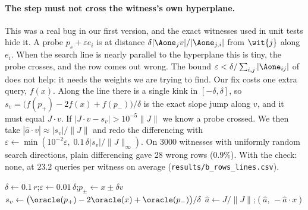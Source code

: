 \paragraph{The step must not cross the witness's own hyperplane.}
This was a real bug in our first version, and the exact witnesses used in
unit tests hide it. A probe $p_s+\varepsilon e_i$ is at distance
$\delta|\Aone_j v|/|\Aone_{j,i}|$ from $\wit{j}$ along $e_i$. When the search
line is nearly parallel to the hyperplane this is tiny, the probe crosses,
and the row comes out wrong. The bound
$\varepsilon<\delta/\sum_{i,j}|\Aone_{ij}|$ of~\cite[\S4.2]{DBLP:conf/crypto/CarliniJM20}
does not help: it needs the weights we are trying to find. Our fix costs one
extra query, $f(x)$. Along the line there is a single kink in
$[-\delta,\delta]$, so
$s_v=\bigl(f(p_{+})-2f(x)+f(p_{-})\bigr)/\delta$ is the exact slope jump along
$v$, and it must equal $J\cdot v$. If $|J\cdot v-s_v|>10^{-5}\|J\|$ we know a
probe crossed. We then take $|\hat a\cdot v|\approx|s_v|/\|J\|$ and redo the
differencing with
$\varepsilon\gets\min(10^{-2}\varepsilon,\;0.1\,\delta|s_v|/\|J\|_\infty)$.
On 3000 witnesses with uniformly random search directions, plain
differencing gave 28 wrong rows ($0.9\%$). With the check: none, at
$23.2$ queries per witness on average (\texttt{results/b\_rows\_lines.csv}).

\begin{algorithm}[t]
\caption{\texttt{row\_from\_witness}: one row of $\Aone$ (up to sign) from a witness.}
\label{alg:B-row}
$\delta\gets 0.1\,r$;\quad $\varepsilon\gets 0.01\,\delta$;\quad $p_{\pm}\gets x\pm\delta v$\;
$s_v\gets\bigl(\oracle(p_+)-2\oracle(x)+\oracle(p_-)\bigr)/\delta$
$\hat a\gets J/\|J\|$;\quad \Return $(\hat a,\,-\hat a\cdot x)$\;
\end{algorithm}

